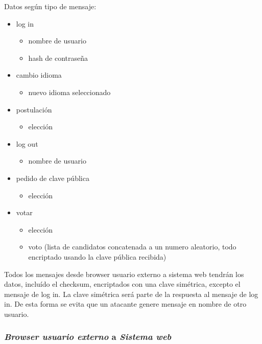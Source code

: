 Datos según tipo de mensaje:
\begin{itemize}
 \item log in


  \begin{itemize}
    \item nombre de usuario
    \item hash de contraseña
  \end{itemize}
  \item cambio idioma
  

  \begin{itemize}
    \item nuevo idioma seleccionado
  \end{itemize}
  \item postulación
  
  \begin{itemize}
    \item elección
  \end{itemize}
  \item log out
  
  \begin{itemize}
    \item nombre de usuario
  \end{itemize}
  \item pedido de clave pública
  
  \begin{itemize}
    \item elección
  \end{itemize}
  \item votar
  
  \begin{itemize}
    \item elección
    \item voto (lista de candidatos concatenada a un 
			numero aleatorio, todo encriptado usando la clave pública recibida)
  \end{itemize}
\end{itemize}



Todos los mensajes desde browser usuario externo a sistema web tendrán los datos, incluído el checksum, encriptados con una clave simétrica, excepto el mensaje de log in. La clave simétrica será parte de la respuesta al mensaje de log in. De esta forma se evita que un atacante genere mensaje en nombre de otro usuario.

\subsubsection{\emph{Browser usuario externo} a \emph{Sistema web}}



